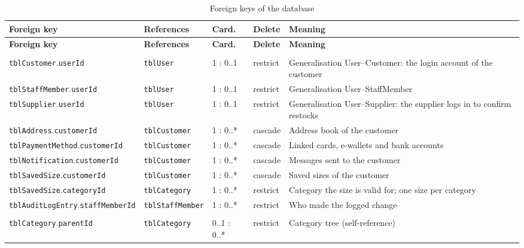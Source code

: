 {\footnotesize
\begin{xltabular}{\textwidth}{@{}L{4.0cm} L{3.2cm} L{1.3cm} L{1.2cm} Y@{}}
\caption{Foreign keys of the database}\label{tab:fkrelations}\\
\toprule
\textbf{Foreign key} & \textbf{References} & \textbf{Card.} & \textbf{Delete} & \textbf{Meaning} \\ \midrule
\endfirsthead
\toprule
\textbf{Foreign key} & \textbf{References} & \textbf{Card.} & \textbf{Delete} & \textbf{Meaning} \\ \midrule
\endhead
\bottomrule
\endlastfoot
{} \\
\texttt{tblCustomer}.\allowbreak\texttt{userId} & \texttt{tblUser} & 1 : 0..1 & restrict & Generalisation User--Customer: the login account of the customer \\
\texttt{tblStaffMember}.\allowbreak\texttt{userId} & \texttt{tblUser} & 1 : 0..1 & restrict & Generalisation User--StaffMember \\
\texttt{tblSupplier}.\allowbreak\texttt{userId} & \texttt{tblUser} & 1 : 0..1 & restrict & Generalisation User--Supplier: the supplier logs in to confirm restocks \\
\texttt{tblAddress}.\allowbreak\texttt{customerId} & \texttt{tblCustomer} & 1 : 0..* & cascade & Address book of the customer \\
\texttt{tblPaymentMethod}.\allowbreak\texttt{customerId} & \texttt{tblCustomer} & 1 : 0..* & cascade & Linked cards, e-wallets and bank accounts \\
\texttt{tblNotification}.\allowbreak\texttt{customerId} & \texttt{tblCustomer} & 1 : 0..* & cascade & Messages sent to the customer \\
\texttt{tblSavedSize}.\allowbreak\texttt{customerId} & \texttt{tblCustomer} & 1 : 0..* & cascade & Saved sizes of the customer \\
\texttt{tblSavedSize}.\allowbreak\texttt{categoryId} & \texttt{tblCategory} & 1 : 0..* & restrict & Category the size is valid for; one size per category \\
\texttt{tblAuditLogEntry}.\allowbreak\texttt{staffMemberId} & \texttt{tblStaffMember} & 1 : 0..* & restrict & Who made the logged change \\ \addlinespace
{} \\
\texttt{tblCategory}.\allowbreak\texttt{parentId} & \texttt{tblCategory} & 0..1 : 0..* & restrict & Category tree (self-reference) \\

\end{xltabular}}
